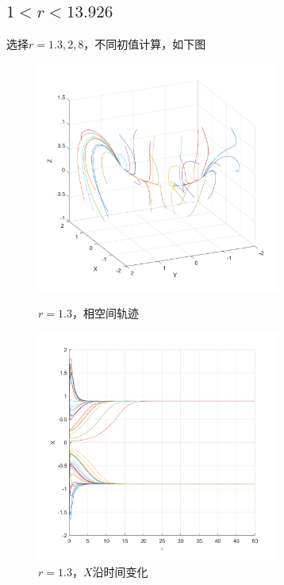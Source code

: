 \documentclass[UTF8,zihao=5]{ctexart} %
\begin{document}
\subsection{$1<r<13.926$}

选择$r=1.3,2,8$，不同初值计算，如下图
\begin{figure}[H]
    \begin{minipage}[c]{0.45\linewidth}  %
        \centering
        \includegraphics[width=8cm]{XYZ_r_1.3.png}  %
        \caption{$r=1.3$，相空间轨迹}
    \end{minipage}
    \hfill %
    \begin{minipage}[c]{0.45\linewidth}  %
        \centering
        \includegraphics[width=8cm]{XT_r_1.3.png}  %
        \caption{$r=1.3$，$X$沿时间变化}
    \end{minipage}
\end{figure}
\end{document}
